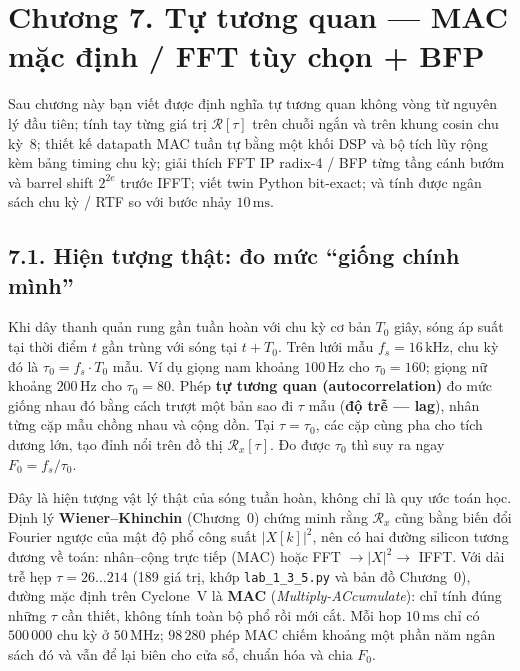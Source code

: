 \clearpage
{}
\section*{Chương 7. Tự tương quan --- MAC mặc định / FFT tùy chọn + BFP}

\begin{learningobj}
Sau chương này bạn viết được định nghĩa tự tương quan không vòng từ nguyên lý đầu tiên; tính tay từng giá trị $\mathcal{R}[\tau]$ trên chuỗi ngắn và trên khung cosin chu kỳ~8; thiết kế datapath MAC tuần tự bằng một khối DSP và bộ tích lũy rộng kèm bảng timing chu kỳ; giải thích FFT IP radix-4 / BFP từng tầng cánh bướm và barrel shift $2^{2e}$ trước IFFT; viết twin Python bit-exact; và tính được ngân sách chu kỳ / RTF so với bước nhảy $10\,\text{ms}$.
\end{learningobj}

\subsection*{7.1. Hiện tượng thật: đo mức ``giống chính mình''}

Khi dây thanh quản rung gần tuần hoàn với chu kỳ cơ bản $T_0$ giây, sóng áp suất tại thời điểm $t$ gần trùng với sóng tại $t+T_0$. Trên lưới mẫu $f_s = 16\,\text{kHz}$, chu kỳ đó là $\tau_0 = f_s\cdot T_0$ mẫu. Ví dụ giọng nam khoảng $100\,\text{Hz}$ cho $\tau_0 = 160$; giọng nữ khoảng $200\,\text{Hz}$ cho $\tau_0 = 80$. Phép \textbf{tự tương quan (autocorrelation)} đo mức giống nhau đó bằng cách trượt một bản sao đi $\tau$ mẫu (\textbf{độ trễ --- lag}), nhân từng cặp mẫu chồng nhau và cộng dồn. Tại $\tau = \tau_0$, các cặp cùng pha cho tích dương lớn, tạo đỉnh nổi trên đồ thị $\mathcal{R}_x[\tau]$. Đo được $\tau_0$ thì suy ra ngay $F_0 = f_s/\tau_0$.

Đây là hiện tượng vật lý thật của sóng tuần hoàn, không chỉ là quy ước toán học. Định lý \textbf{Wiener--Khinchin} (Chương~0) chứng minh rằng $\mathcal{R}_x$ cũng bằng biến đổi Fourier ngược của mật độ phổ công suất $|X[k]|^2$, nên có hai đường silicon tương đương về toán: nhân--cộng trực tiếp (MAC) hoặc FFT $\to |X|^2 \to$ IFFT. Với dải trễ hẹp $\tau = 26 \ldots 214$ (189 giá trị, khớp \texttt{lab\_1\_3\_5.py} và bản đồ Chương~0), đường mặc định trên Cyclone~V là \textbf{MAC} (\emph{Multiply-ACcumulate}): chỉ tính đúng những $\tau$ cần thiết, không tính toàn bộ phổ rồi mới cắt. Mỗi hop $10\,\text{ms}$ chỉ có $500\,000$ chu kỳ ở $50\,\text{MHz}$; $98\,280$ phép MAC chiếm khoảng một phần năm ngân sách đó và vẫn để lại biên cho cửa sổ, chuẩn hóa và chia $F_0$.

